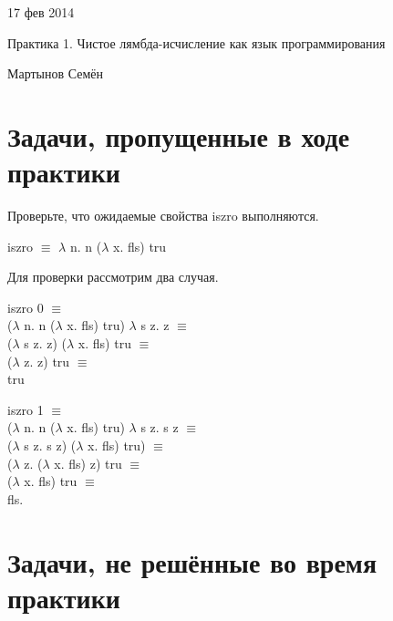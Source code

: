 \documentclass[a4paper,12pt]{article} %
\begin{document}
\begin{flushright}
{\color{red} 17 фев 2014}

Практика 1. Чистое лямбда-исчисление как язык программирования

Мартынов Семён

\hrulefill
\end{flushright}

\section{Задачи, пропущенные в ходе практики}

\begin{enumerate}
{\item Проверьте, что ожидаемые свойства iszro выполняются.}

iszro $\equiv$ $\lambda$ n. n ($\lambda$ x. fls) tru

  \begin{adjustwidth}{1em}{0pt}
  Для проверки рассмотрим два случая.
  
  iszro 0 $\equiv$ \\
  ($\lambda$ n. n ($\lambda$ x. fls) tru) $\lambda$ s z. z $\equiv$ \\
  ($\lambda$ s z. z) ($\lambda$ x. fls) tru $\equiv$ \\
  ($\lambda$ z.  z)  tru $\equiv$ \\
  tru
  
  iszro 1 $\equiv$ \\
  ($\lambda$ n. n ($\lambda$ x. fls) tru) $\lambda$ s z. s z $\equiv$ \\
  ($\lambda$ s z. s z) ($\lambda$ x. fls) tru) $\equiv$ \\
  ($\lambda$ z. ($\lambda$ x. fls) z) tru $\equiv$ \\
  ($\lambda$ x. fls) tru $\equiv$ \\
  fls.
  \end{adjustwidth}

\end{enumerate}

\section{Задачи, не решённые во время практики}
\end{document}
